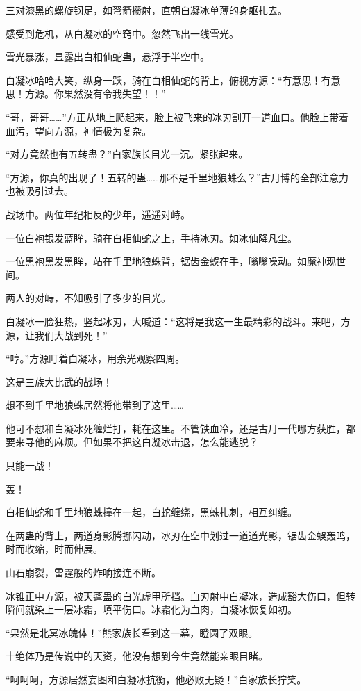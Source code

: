 \begin{this_body}
三对漆黑的螺旋钢足，如弩箭攒射，直朝白凝冰单薄的身躯扎去。

感受到危机，从白凝冰的空窍中。忽然飞出一线雪光。

雪光暴涨，显露出白相仙蛇蛊，悬浮于半空中。

白凝冰哈哈大笑，纵身一跃，骑在白相仙蛇的背上，俯视方源：“有意思！有意思！方源。你果然没有令我失望！！”

“哥，哥哥……”方正从地上爬起来，脸上被飞来的冰刃割开一道血口。他脸上带着血污，望向方源，神情极为复杂。

“对方竟然也有五转蛊？”白家族长目光一沉。紧张起来。

“方源，你真的出现了！五转的蛊……那不是千里地狼蛛么？”古月博的全部注意力也被吸引过去。

战场中。两位年纪相反的少年，遥遥对峙。

一位白袍银发蓝眸，骑在白相仙蛇之上，手持冰刃。如冰仙降凡尘。

一位黑袍黑发黑眸，站在千里地狼蛛背，锯齿金蜈在手，嗡嗡噪动。如魔神现世间。

两人的对峙，不知吸引了多少的目光。

白凝冰一脸狂热，竖起冰刃，大喊道：“这将是我这一生最精彩的战斗。来吧，方源，让我们大战到死！”

“哼。”方源盯着白凝冰，用余光观察四周。

这是三族大比武的战场！

想不到千里地狼蛛居然将他带到了这里……

他可不想和白凝冰死缠烂打，耗在这里。不管铁血冷，还是古月一代哪方获胜，都要来寻他的麻烦。但如果不把这白凝冰击退，怎么能逃脱？

只能一战！

轰！

白相仙蛇和千里地狼蛛撞在一起，白蛇缠绕，黑蛛扎刺，相互纠缠。

在两蛊的背上，两道身影腾挪闪动，冰刃在空中划过一道道光影，锯齿金蜈轰鸣，时而收缩，时而伸展。

山石崩裂，雷霆般的炸响接连不断。

冰锥正中方源，被天蓬蛊的白光虚甲所挡。血刃射中白凝冰，造成豁大伤口，但转瞬间就染上一层冰霜，填平伤口。冰霜化为血肉，白凝冰恢复如初。

“果然是北冥冰魄体！”熊家族长看到这一幕，瞪圆了双眼。

十绝体乃是传说中的天资，他没有想到今生竟然能亲眼目睹。

“呵呵呵，方源居然妄图和白凝冰抗衡，他必败无疑！”白家族长狞笑。


\end{this_body}
